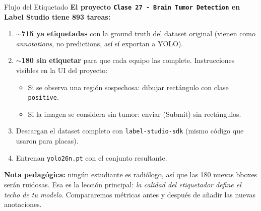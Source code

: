 \documentclass[aspectratio=169, 11pt]{beamer}
\begin{document}
\begin{frame}[shrink]{Flujo del Etiquetado}
  \vspace{6pt}
  {\footnotesize\color{arcaDark}\bfseries
    El proyecto \texttt{Clase 27 - Brain Tumor Detection} en Label
    Studio tiene 893 tareas:}

  \vspace{10pt}
  {\footnotesize
  \begin{enumerate}\setlength{\itemsep}{5pt}
    \item \textbf{$\sim$715 ya etiquetadas} con la ground truth del
      dataset original (vienen como \emph{annotations}, no predictions,
      as\'i s\'i exportan a YOLO).
    \item \textbf{$\sim$180 sin etiquetar} para que cada equipo las complete.
      Instrucciones visibles en la UI del proyecto:
      \begin{itemize}\setlength{\itemsep}{2pt}
        \item Si se observa una regi\'on sospechosa: dibujar
          rect\'angulo con clase \texttt{positive}.
        \item Si la imagen se considera sin tumor: enviar (Submit) sin
          rect\'angulos.
      \end{itemize}
    \item Descargan el dataset completo con \texttt{label-studio-sdk}
      (mismo c\'odigo que usaron para placas).
    \item Entrenan \texttt{yolo26n.pt} con el conjunto resultante.
  \end{enumerate}
  }

  \vspace{6pt}
  \begin{tcolorbox}[colback=codeGreen!8, colframe=codeGreen, boxrule=0.5pt,
    arc=2pt, left=6pt, right=6pt, top=4pt, bottom=4pt]
    {\scriptsize\color{arcaDark}
    \faLightbulb\hspace{4pt}\textbf{Nota pedag\'ogica:} ning\'un
    estudiante es radi\'ologo, as\'i que las 180 nuevas bboxes ser\'an
    ruidosas. Esa es la lecci\'on principal: \emph{la calidad del
    etiquetador define el techo de tu modelo}. Compararemos m\'etricas
    antes y despu\'es de a\~nadir las nuevas anotaciones.}
  \end{tcolorbox}
\end{frame}
\end{document}
